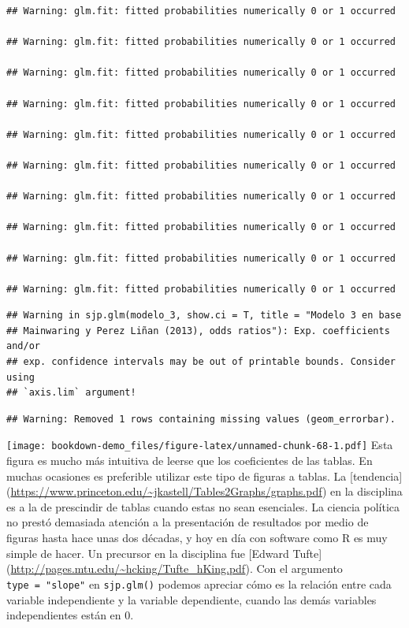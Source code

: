\documentclass[]{book}
\begin{document}
\begin{verbatim}
## Warning: glm.fit: fitted probabilities numerically 0 or 1 occurred

## Warning: glm.fit: fitted probabilities numerically 0 or 1 occurred

## Warning: glm.fit: fitted probabilities numerically 0 or 1 occurred

## Warning: glm.fit: fitted probabilities numerically 0 or 1 occurred

## Warning: glm.fit: fitted probabilities numerically 0 or 1 occurred

## Warning: glm.fit: fitted probabilities numerically 0 or 1 occurred

## Warning: glm.fit: fitted probabilities numerically 0 or 1 occurred

## Warning: glm.fit: fitted probabilities numerically 0 or 1 occurred

## Warning: glm.fit: fitted probabilities numerically 0 or 1 occurred

## Warning: glm.fit: fitted probabilities numerically 0 or 1 occurred
\end{verbatim}

\begin{verbatim}
## Warning in sjp.glm(modelo_3, show.ci = T, title = "Modelo 3 en base
## Mainwaring y Perez Liñan (2013), odds ratios"): Exp. coefficients and/or
## exp. confidence intervals may be out of printable bounds. Consider using
## `axis.lim` argument!
\end{verbatim}

\begin{verbatim}
## Warning: Removed 1 rows containing missing values (geom_errorbar).
\end{verbatim}

\texttt{[image: bookdown-demo\_files/figure-latex/unnamed-chunk-68-1.pdf]}
Esta figura es mucho más intuitiva de leerse que los coeficientes de las
tablas. En muchas ocasiones es preferible utilizar este tipo de figuras
a tablas. La {[}tendencia{]}
(\url{https://www.princeton.edu/~jkastell/Tables2Graphs/graphs.pdf}) en
la disciplina es a la de prescindir de tablas cuando estas no sean
esenciales. La ciencia política no prestó demasiada atención a la
presentación de resultados por medio de figuras hasta hace unas dos
décadas, y hoy en día con software como R es muy simple de hacer. Un
precursor en la disciplina fue {[}Edward Tufte{]}
(\url{http://pages.mtu.edu/~hcking/Tufte_hKing.pdf}). Con el argumento
\texttt{type\ =\ "slope"} en \texttt{sjp.glm()} podemos apreciar cómo es
la relación entre cada variable independiente y la variable dependiente,
cuando las demás variables independientes están en 0.
\end{document}
